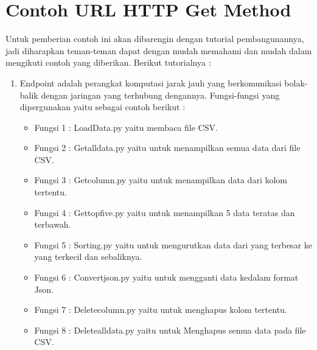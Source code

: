 \section {Contoh URL HTTP Get Method}
Untuk pemberian contoh ini akan dibarengin dengan tutorial pembangunannya, jadi diharapkan teman-teman dapat dengan mudah memahami dan mudah dalam mengikuti contoh yang diberikan. Berikut tutorialnya :
\begin{enumerate}
  \item Endpoint adalah perangkat komputasi jarak jauh yang berkomunikasi bolak-balik dengan jaringan yang terhubung dengannya. Fungsi-fungsi yang dipergunakan yaitu sebagai contoh berikut :
      \begin{itemize}
        \item Fungsi 1 : LoadData.py yaitu membaca file CSV.
            
        \item Fungsi 2 : Getalldata.py yaitu untuk menampilkan semua data dari file CSV.
            
        \item Fungsi 3 : Getcolumn.py yaitu untuk menampilkan data dari kolom tertentu.
            
        \item Fungsi 4 : Gettopfive.py yaitu untuk menampilkan 5 data teratas dan terbawah.
            
        \item Fungsi 5 : Sorting.py yaitu untuk mengurutkan data dari yang terbesar ke yang terkecil dan sebaliknya.
            
        \item Fungsi 6 : Convertjson.py yaitu untuk mengganti data kedalam format Json.
            
        \item Fungsi 7 : Deletecolumn.py yaitu untuk menghapus kolom tertentu.
            
        \item Fungsi 8 : Deletealldata.py yaitu untuk Menghapus semua data pada file CSV.

\end{itemize}
\end{enumerate}
